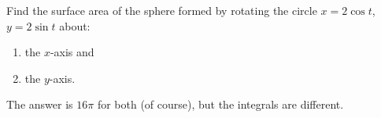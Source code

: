 {Find the surface area of the sphere formed by rotating the circle $x=2\cos t$,\quad $y=2\sin t$ about:
\begin{enumerate}
	\item the $x$-axis and
	\item	the $y$-axis.
\end{enumerate}
}
{The answer is $16\pi$ for both (of course), but the integrals are different.}
